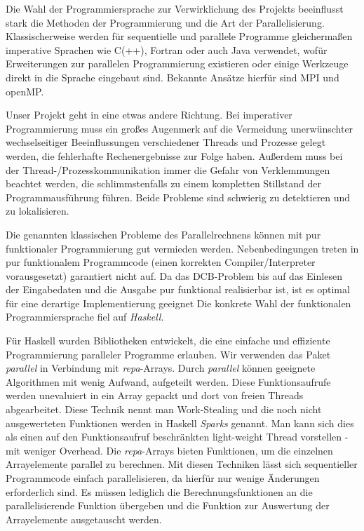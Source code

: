 \documentclass[a4paper]{scrartcl}
\begin{document}
Die Wahl der Programmiersprache zur Verwirklichung des Projekts beeinflusst stark die Methoden der Programmierung und die Art der Parallelisierung. Klassischerweise werden für sequentielle und parallele Programme gleichermaßen imperative Sprachen wie C(++), Fortran oder auch Java verwendet, wofür Erweiterungen zur parallelen Programmierung existieren oder einige Werkzeuge direkt in die Sprache eingebaut sind. Bekannte Ansätze hierfür sind MPI und openMP. \par
Unser Projekt geht in eine etwas andere Richtung. Bei imperativer Programmierung muss ein großes Augenmerk auf die Vermeidung unerwünschter wechselseitiger Beeinflussungen verschiedener Threads und Prozesse gelegt werden, die fehlerhafte Rechenergebnisse zur Folge haben. Außerdem muss bei der Thread-/Prozesskommunikation immer die Gefahr von Verklemmungen beachtet werden, die schlimmstenfalls zu einem kompletten Stillstand der Programmausführung führen. Beide Probleme sind schwierig zu detektieren und zu lokalisieren.\par
Die genannten klassischen Probleme des Parallelrechnens können mit pur funktionaler Programmierung gut vermieden werden. Nebenbedingungen treten in pur funktionalem Programmcode (einen korrekten Compiler/Interpreter vorausgesetzt) garantiert nicht auf. Da das DCB-Problem bis auf das Einlesen der Eingabedaten und die Ausgabe pur funktional realisierbar ist, ist es optimal für eine derartige Implementierung geeignet Die konkrete Wahl der funktionalen Programmiersprache fiel auf \emph{Haskell}. \par
\medskip
Für Haskell wurden Bibliotheken entwickelt, die eine einfache und effiziente Programmierung paralleler Programme erlauben. Wir verwenden das Paket \emph{parallel} in Verbindung mit \emph{repa}-Arrays. Durch \emph{parallel} können geeignete Algorithmen mit wenig Aufwand, aufgeteilt werden. Diese Funktionsaufrufe werden unevaluiert in ein Array gepackt und dort von freien Threads abgearbeitet. Diese Technik nennt man Work-Stealing und die noch nicht ausgewerteten Funktionen werden in Haskell \emph{Sparks} genannt. Man kann sich dies als einen auf den Funktionsaufruf beschränkten light-weight Thread vorstellen - mit weniger Overhead. Die \emph{repa}-Arrays bieten Funktionen, um die einzelnen Arrayelemente parallel zu berechnen. Mit diesen Techniken lässt sich sequentieller Programmcode einfach parallelisieren, da hierfür nur wenige Änderungen erforderlich sind. Es müssen lediglich die Berechnungsfunktionen an die parallelisierende Funktion übergeben und die Funktion zur Auswertung der Arrayelemente ausgetauscht werden. \par
\end{document}
